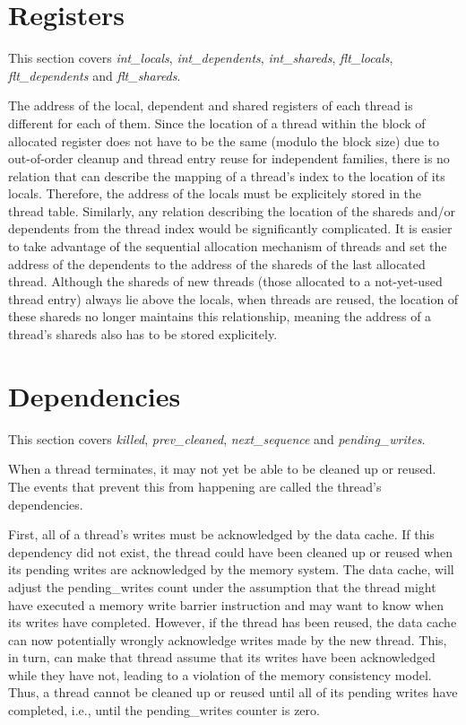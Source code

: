 \section{Registers}
This section covers \emph{int\_locals}, \emph{int\_dependents}, \emph{int\_shareds}, \emph{flt\_locals}, \emph{flt\_dependents} and \emph{flt\_shareds}.

The address of the local, dependent and shared registers of each thread is different for each of them. Since the location of a thread within the block of allocated register does not have to be the same (modulo the block size) due to out-of-order cleanup and thread entry reuse for independent families, there is no relation that can describe the mapping of a thread's index to the location of its locals. Therefore, the address of the locals must be explicitely stored in the thread table. Similarly, any relation describing the location of the shareds and/or dependents from the thread index would be significantly complicated. It is easier to take advantage of the sequential allocation mechanism of threads and set the address of the dependents to the address of the shareds of the last allocated thread. Although the shareds of new threads (those allocated to a not-yet-used thread entry) always lie above the locals, when threads are reused, the location of these shareds no longer maintains this relationship, meaning the address of a thread's shareds also has to be stored explicitely.

\section{\label{sec:thread-dependencies}Dependencies}
This section covers \emph{killed}, \emph{prev\_cleaned}, \emph{next\_sequence} and \emph{pending\_writes}.

When a thread terminates, it may not yet be able to be cleaned up or reused. The events that prevent this from happening are called the thread's dependencies.

First, all of a thread's writes must be acknowledged by the data cache. If this dependency did not exist, the thread could have been cleaned up or reused when its pending writes are acknowledged by the memory system. The data cache, will adjust the pending\_writes count under the assumption that the thread might have executed a memory write barrier instruction and may want to know when its writes have completed. However, if the thread has been reused, the data cache can now potentially wrongly acknowledge writes made by the new thread. This, in turn, can make that thread assume that its writes have been acknowledged while they have not, leading to a violation of the memory consistency model. Thus, a thread cannot be cleaned up or reused until all of its pending writes have completed, i.e., until the pending\_writes counter is zero.


